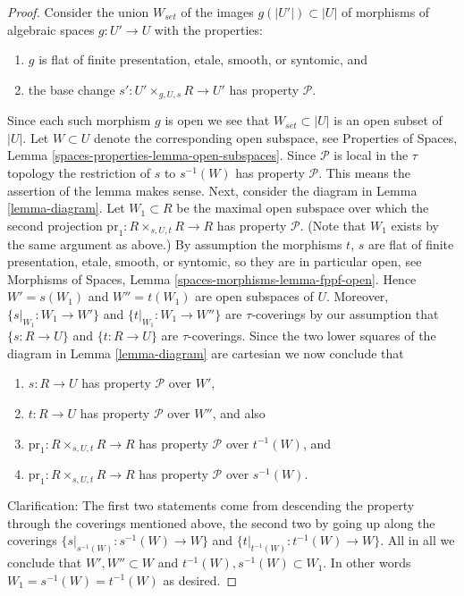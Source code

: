 \begin{proof}
Consider the union $W_{set}$ of the images $g(|U'|) \subset |U|$ of
morphisms of algebraic spaces $g : U' \to U$ with the properties:
\begin{enumerate}
\item $g$ is flat of finite presentation, etale, smooth, or syntomic, and
\item the base change $s' : U' \times_{g, U, s} R \to U'$ has property
$\mathcal{P}$.
\end{enumerate}
Since each such morphism $g$ is open we see that $W_{set} \subset |U|$
is an open subset of $|U|$. Let $W \subset U$ denote the corresponding
open subspace, see
Properties of Spaces, Lemma \ref{spaces-properties-lemma-open-subspaces}.
Since $\mathcal{P}$ is local in the $\tau$ topology the
restriction of $s$ to $s^{-1}(W)$ has property $\mathcal{P}$.
This means the assertion of the lemma makes sense.
Next, consider the diagram in Lemma \ref{lemma-diagram}.
Let $W_1 \subset R$ be the maximal open subspace over which the
second projection
$\text{pr}_1 : R \times_{s, U, t} R \to R$ has property $\mathcal{P}$.
(Note that $W_1$ exists by the same argument as above.)
By assumption the morphisms $t$, $s$ are
flat of finite presentation, etale, smooth, or syntomic, so they are
in particular open, see
Morphisms of Spaces, Lemma \ref{spaces-morphisms-lemma-fppf-open}.
Hence $W' = s(W_1)$ and $W'' = t(W_1)$ are open subspaces of $U$.
Moreover, $\{s|_{W_1} : W_1 \to W'\}$ and $\{t|_{W_1} : W_1 \to W''\}$
are $\tau$-coverings by our assumption that
$\{s : R \to U\}$ and $\{t : R \to U\}$ are $\tau$-coverings.
Since the two lower squares of the diagram in Lemma \ref{lemma-diagram}
are cartesian we now conclude that
\begin{enumerate}
\item $s : R \to U$ has property $\mathcal{P}$ over $W'$,
\item $t : R \to U$ has property $\mathcal{P}$ over $W''$, and also
\item $\text{pr}_1 : R \times_{s, U, t} R \to R$ has property
$\mathcal{P}$ over $t^{-1}(W)$, and
\item $\text{pr}_1 : R \times_{s, U, t} R \to R$ has property
$\mathcal{P}$ over $s^{-1}(W)$.
\end{enumerate}
Clarification: The first two statements come from descending the property
through the coverings mentioned above, the second two by going up along the
coverings $\{s|_{s^{-1}(W)} : s^{-1}(W) \to W\}$ and
$\{t|_{t^{-1}(W)} : t^{-1}(W) \to W\}$.
All in all we conclude that
$W', W'' \subset W$ and $t^{-1}(W), s^{-1}(W) \subset W_1$. In other words
$W_1 = s^{-1}(W) = t^{-1}(W)$ as desired.
\end{proof}


